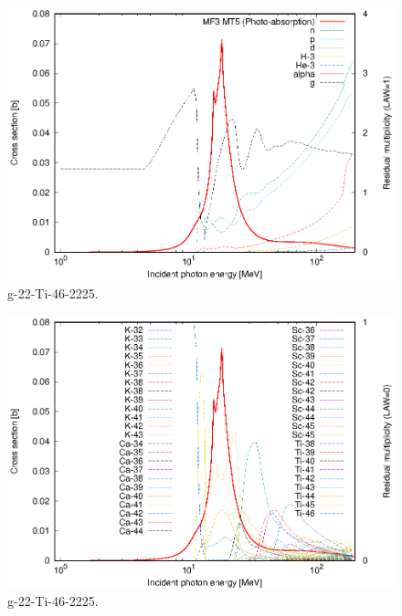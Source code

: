\begin{figure}
 \includegraphics[width=\linewidth]{eps/g_22-Ti-46_2225.eps}
  \caption{g-22-Ti-46-2225.}
\end{figure}
\begin{figure}
 \includegraphics[width=\linewidth]{eps-law0/g_22-Ti-46_2225.eps}
 \caption{g-22-Ti-46-2225.}
\end{figure}
\newpage \clearpage

